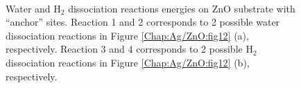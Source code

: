 \begingroup
\begin{figure}[!ht]
  \centering
  \label{Chap:Ag/ZnO:fig:13a}
  \label{Chap:Ag/ZnO:fig:13b}
  \\
  \label{Chap:Ag/ZnO:fig:13c}
  \label{Chap:Ag/ZnO:fig:13d}
\caption[Water and $\text{H}_{\text{2}}$ dissociation reactions energies on ZnO substrate with ``anchor'' sites.]{Water and $\text{H}_{\text{2}}$ dissociation reactions energies on ZnO substrate with ``anchor'' sites. Reaction 1 and 2 corresponds to 2 possible water dissociation reactions in Figure
\ref{Chap:Ag/ZnO:fig12} (a), respectively. Reaction 3 and 4 corresponds to 2 possible $\text{H}_{\text{2}}$ dissociation reactions in Figure \ref{Chap:Ag/ZnO:fig12} (b), respectively.}
\label{Chap:Ag/ZnO:fig13}
\end{figure}
\endgroup

